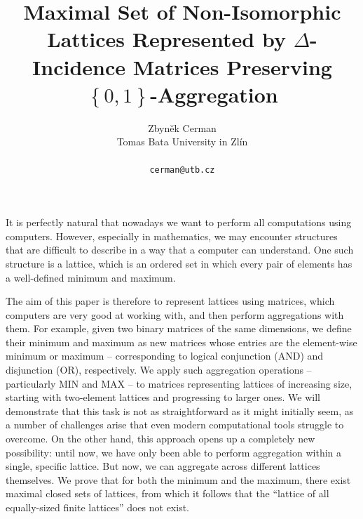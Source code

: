 \documentclass[a4paper]{article} %
\date{} %
\begin{document}
\setcounter{page}{1} %

\title{Maximal Set of Non-Isomorphic Lattices Represented by $\Delta$-Incidence Matrices Preserving $\left\lbrace 0,1 \right\rbrace$-Aggregation}

\author{Zbyn\v{e}k Cerman \\ %
       Tomas Bata University in Zl\'{i}n\\ \\ %
       \texttt{cerman@utb.cz} %
       }%

\maketitle


It is perfectly natural that nowadays we want to perform all computations using computers. However, especially in mathematics, we may encounter structures that are difficult to describe in a way that a computer can understand. One such structure is a lattice, which is an ordered set in which every pair of elements has a well-defined minimum and maximum.

The aim of this paper is therefore to represent lattices using matrices, which computers are very good at working with, and then perform aggregations with them. For example, given two binary matrices of the same dimensions, we define their minimum and maximum as new matrices whose entries are the element-wise minimum or maximum – corresponding to logical conjunction (AND) and disjunction (OR), respectively. We apply such aggregation operations – particularly MIN and MAX – to matrices representing lattices of increasing size, starting with two-element lattices and progressing to larger ones. We will demonstrate that this task is not as straightforward as it might initially seem, as a number of challenges arise that even modern computational tools struggle to overcome. On the other hand, this approach opens up a completely new possibility: until now, we have only been able to perform aggregation within a single, specific lattice. But now, we can aggregate across different lattices themselves. We prove that for both the minimum and the maximum, there exist maximal closed sets of lattices, from which it follows that the “lattice of all equally-sized finite lattices” does not exist.
\end{document}
